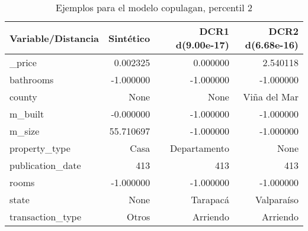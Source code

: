 \begin{table}[H]
\centering
\fontsize{10}{14}\selectfont
\caption{Ejemplos para el modelo copulagan, percentil 2}
\label{table-example-economicos-b-2-copulagan-2p}
\begin{tabular}{|l|r|r|r|}
\hline
\rowcolor[gray]{0.8}
Variable/Distancia & Sintético & DCR1 d(9.00e-17) & DCR2 d(6.68e-16) \\
\hline \_price & \cellcolor[rgb]{0.9, 0.54, 0.52} 0.002325 & \cellcolor[rgb]{0.9, 0.54, 0.52} 0.000000 & 2.540118 \\
\hline bathrooms & \cellcolor[rgb]{0.9, 0.54, 0.52} -1.000000 & \cellcolor[rgb]{0.9, 0.54, 0.52} -1.000000 & \cellcolor[rgb]{0.9, 0.54, 0.52} -1.000000 \\
\hline county & \cellcolor[rgb]{0.9, 0.54, 0.52} None & \cellcolor[rgb]{0.9, 0.54, 0.52} None & Viña del Mar \\
\hline m\_built & \cellcolor[rgb]{0.9, 0.54, 0.52} -0.000000 & \cellcolor[rgb]{0.9, 0.54, 0.52} -1.000000 & \cellcolor[rgb]{0.9, 0.54, 0.52} -1.000000 \\
\hline m\_size & \cellcolor[rgb]{0.9, 0.54, 0.52} 55.710697 & -1.000000 & -1.000000 \\
\hline property\_type & \cellcolor[rgb]{0.9, 0.54, 0.52} Casa & Departamento & None \\
\hline publication\_date & \cellcolor[rgb]{0.9, 0.54, 0.52} 413 & \cellcolor[rgb]{0.9, 0.54, 0.52} 413 & \cellcolor[rgb]{0.9, 0.54, 0.52} 413 \\
\hline rooms & \cellcolor[rgb]{0.9, 0.54, 0.52} -1.000000 & \cellcolor[rgb]{0.9, 0.54, 0.52} -1.000000 & \cellcolor[rgb]{0.9, 0.54, 0.52} -1.000000 \\
\hline state & \cellcolor[rgb]{0.9, 0.54, 0.52} None & Tarapacá & Valparaíso \\
\hline transaction\_type & \cellcolor[rgb]{0.9, 0.54, 0.52} Otros & Arriendo & Arriendo \\
\hline
\end{tabular}
\end{table}
